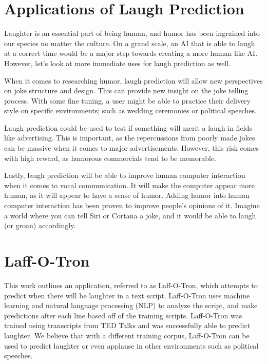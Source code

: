 \section{Applications of Laugh Prediction}
Laughter is an essential part of being human, and humor has been ingrained into our species no matter the culture. On a grand scale, an AI that is able to laugh at a correct time would be a major step towards creating a more human like AI. However, let's look at more immediate uses for laugh prediction as well.

When it comes to researching humor, laugh prediction will allow new perspectives on joke structure and design. This can provide new insight on the joke telling process. With some fine tuning, a user might be able to practice their delivery style on specific environments; such as wedding ceremonies or political speeches. 

Laugh prediction could be used to test if something will merit a laugh in fields like advertising. This is important, as the repercussions from poorly made jokes can be massive when it comes to major advertisements. However, this risk comes with high reward, as humorous commercials tend to be memorable.

Lastly, laugh prediction will be able to improve human computer interaction when it comes to vocal communication. It will make the computer appear more human, as it will appear to have a sense of humor. Adding humor into human computer interaction has been proven to improve people's opinions of it.\cite{Teaching}\cite{Multi-Humoroid} Imagine a world where you can tell Siri or Cortana a joke, and it would be able to laugh (or groan) accordingly. 

\section{Laff-O-Tron}
This work outlines an application, referred to as Laff-O-Tron, which attempts to predict when there will be laughter in a text script. Laff-O-Tron uses machine learning and natural language processing (NLP) to analyze the script, and make predictions after each line based off of the training scripts. Laff-O-Tron was trained using transcripts from TED Talks and was successfully able to predict laughter. We believe that with a different training corpus, Laff-O-Tron can be used to predict laughter or even applause in other environments such as political speeches.

